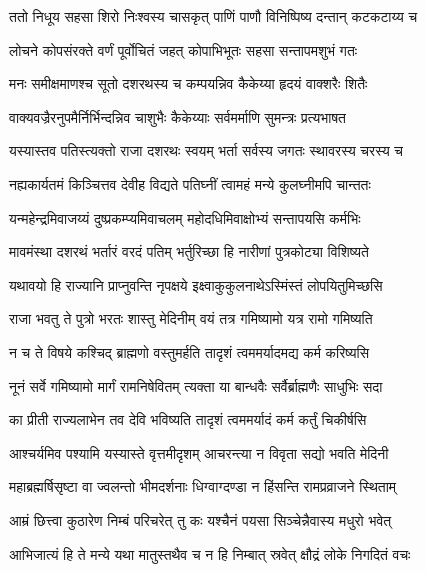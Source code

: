 
\twolineshloka
{ततो निधूय सहसा शिरो निःश्वस्य चासकृत्}
{पाणिं पाणौ विनिष्पिष्य दन्तान् कटकटाय्य च} %

\twolineshloka
{लोचने कोपसंरक्ते वर्णं पूर्वोचितं जहत्}
{कोपाभिभूतः सहसा सन्तापमशुभं गतः} %

\twolineshloka
{मनः समीक्षमाणश्च सूतो दशरथस्य च}
{कम्पयन्निव कैकेय्या हृदयं वाक्शरैः शितैः} %

\twolineshloka
{वाक्यवज्रैरनुपमैर्निर्भिन्दन्निव चाशुभैः}
{कैकेय्याः सर्वमर्माणि सुमन्त्रः प्रत्यभाषत} %

\twolineshloka
{यस्यास्तव पतिस्त्यक्तो राजा दशरथः स्वयम्}
{भर्ता सर्वस्य जगतः स्थावरस्य चरस्य च} %

\twolineshloka
{नह्यकार्यतमं किञ्चित्तव देवीह विद्यते}
{पतिघ्नीं त्वामहं मन्ये कुलघ्नीमपि चान्ततः} %

\twolineshloka
{यन्महेन्द्रमिवाजय्यं दुष्प्रकम्प्यमिवाचलम्}
{महोदधिमिवाक्षोभ्यं सन्तापयसि कर्मभिः} %

\twolineshloka
{मावमंस्था दशरथं भर्तारं वरदं पतिम्}
{भर्तुरिच्छा हि नारीणां पुत्रकोट्या विशिष्यते} %

\twolineshloka
{यथावयो हि राज्यानि प्राप्नुवन्ति नृपक्षये}
{इक्ष्वाकुकुलनाथेऽस्मिंस्तं लोपयितुमिच्छसि} %

\twolineshloka
{राजा भवतु ते पुत्रो भरतः शास्तु मेदिनीम्}
{वयं तत्र गमिष्यामो यत्र रामो गमिष्यति} %

\twolineshloka
{न च ते विषये कश्चिद् ब्राह्मणो वस्तुमर्हति}
{तादृशं त्वममर्यादमद्य कर्म करिष्यसि} %

\twolineshloka
{नूनं सर्वे गमिष्यामो मार्गं रामनिषेवितम्}
{त्यक्ता या बान्धवैः सर्वैर्ब्राह्मणैः साधुभिः सदा} %

\twolineshloka
{का प्रीती राज्यलाभेन तव देवि भविष्यति}
{तादृशं त्वममर्यादं कर्म कर्तुं चिकीर्षसि} %

\twolineshloka
{आश्चर्यमिव पश्यामि यस्यास्ते वृत्तमीदृशम्}
{आचरन्त्या न विवृता सद्यो भवति मेदिनी} %

\twolineshloka
{महाब्रह्मर्षिसृष्टा वा ज्वलन्तो भीमदर्शनाः}
{धिग्वाग्दण्डा न हिंसन्ति रामप्रव्राजने स्थिताम्} %

\twolineshloka
{आम्रं छित्त्वा कुठारेण निम्बं परिचरेत् तु कः}
{यश्चैनं पयसा सिञ्चेन्नैवास्य मधुरो भवेत्} %

\twolineshloka
{आभिजात्यं हि ते मन्ये यथा मातुस्तथैव च}
{न हि निम्बात् स्रवेत् क्षौद्रं लोके निगदितं वचः} %


